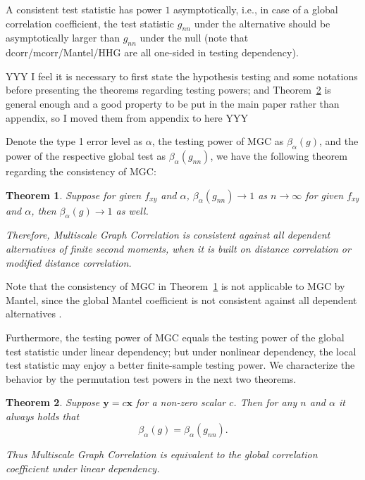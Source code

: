 \documentclass[11pt]{article}
\providecommand{\mb}[1]{\boldsymbol{#1}}
\newtheorem{thm}{Theorem}
\begin{document}
A consistent test statistic has power $1$ asymptotically, i.e., in case of a global correlation coefficient, the test statistic $g_{nn}$ under the alternative should be asymptotically larger than $g_{nn}$ under the null (note that dcorr/mcorr/Mantel/HHG are all one-sided in testing dependency).

YYY I feel it is necessary to first state the hypothesis testing and some notations before presenting the theorems regarding testing powers; and Theorem~\ref{thm2} is general enough and a good property to be put in the main paper rather than appendix, so I moved them from appendix to here YYY

Denote the type 1 error level as $\alpha$, the testing power of MGC as $\beta_{\alpha}(g)$, and the power of the respective global test as $\beta_{\alpha}(g_{nn})$, we have the following theorem regarding the consistency of MGC:
\begin{thm}
\label{thm1}
Suppose for given $f_{xy}$ and $\alpha$, $\beta_{\alpha}(g_{nn}) \rightarrow 1$ as $n \rightarrow \infty$ for given $f_{xy}$ and $\alpha$, then $\beta_{\alpha}(g) \rightarrow 1$ as well.

Therefore, Multiscale Graph Correlation is consistent against all dependent alternatives of finite second moments, when it is built on distance correlation or modified distance correlation.
\end{thm}

Note that the consistency of MGC in Theorem~\ref{thm1} is not applicable to MGC by Mantel, since the global Mantel coefficient is not consistent against all dependent alternatives \cite{JosseHolmes2013}. 

Furthermore, the testing power of MGC equals the testing power of the global test statistic under linear dependency; but under nonlinear dependency, the local test statistic may enjoy a better finite-sample testing power. We characterize the behavior by the permutation test powers in the next two theorems.

\begin{thm}
\label{thm2}
Suppose $\mb{y}=c\mb{x}$ for a non-zero scalar $c$. Then for any $n$ and $\alpha$ it always holds that
\begin{equation}
\beta_{\alpha}(g) = \beta_{\alpha}(g_{nn}).
\end{equation}

Thus Multiscale Graph Correlation is equivalent to the global correlation coefficient under linear dependency.
\end{thm}
\end{document}
